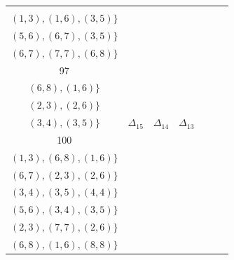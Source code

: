 \documentclass{amsart}
\theoremstyle{plain}
\theoremstyle{definition}
\numberwithin{theorem}{section}
\numberwithin{equation}{section}
\numberwithin{equation}{theorem}
\begin{document}
{\begin{landscape}
\begin{longtable}{|c|c|c|c|c|c|c|}
\begin{tabular}{c}
$\Delta_{10}:=\{(1,1),(5,6),$\\
$(1,3),(1,6),(3,5)\}$
\end{tabular}
&
\begin{tabular}{c}
$\Delta_{11}:=\{(3,7),(5,5),$\\
$(5,6),(6,7),(3,5)\}$
\end{tabular}
&
\begin{tabular}{c}
$\Delta_{12}:=\{(3,7),(3,8),$\\
$(6,7),(7,7),(6,8)\}$
\end{tabular}
\\
\hline
97
&
\begin{tabular}{c}
$\Delta_{13}:=\{(3,8),(1,3),$\\
$(6,8),(1,6)\}$
\end{tabular}
&
\begin{tabular}{c}
$\Delta_{14}:=\{(3,7),(6,7),$\\
$(2,3),(2,6)\}$
\end{tabular}
&
\begin{tabular}{c}
$\Delta_{15}:=\{(4,6),(5,6),$\\
$(3,4),(3,5)\}$
\end{tabular}
& $\Delta_{15}$
& $\Delta_{14}$
& $\Delta_{13}$
\\
\hline
100
&
\begin{tabular}{c}
$\Delta_{16}:=\{(1,1),(3,8),$\\
$(1,3),(6,8),(1,6)\}$
\end{tabular}
&
\begin{tabular}{c}
$\Delta_{17}:=\{(3,7),(2,2),$\\
$(6,7),(2,3),(2,6)\}$
\end{tabular}
&
\begin{tabular}{c}
$\Delta_{18}:=\{(4,6),(5,6),$\\
$(3,4),(3,5),(4,4)\}$
\end{tabular}
&
\begin{tabular}{c}
$\Delta_{19}:=\{(4,6),(5,5),$\\
$(5,6),(3,4),(3,5)\}$
\end{tabular}
&
\begin{tabular}{c}
$\Delta_{20}:=\{(3,7),(6,7),$\\
$(2,3),(7,7),(2,6)\}$
\end{tabular}
&
\begin{tabular}{c}
$\Delta_{21}:=\{(3,8),(1,3),$\\
$(6,8),(1,6),(8,8)\}$

\end{tabular}
\end{longtable}
\end{landscape}}
\end{document}
